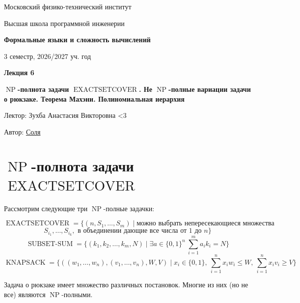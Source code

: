 \documentclass[11pt]{article}
\DeclareMathOperator{\NP}{NP}
\DeclareMathOperator{\EXACTSETC}{EXACTSETCOVER}
\DeclareMathOperator{\SUBSUM}{SUBSET-SUM}
\DeclareMathOperator{\KNAPSACK}{KNAPSACK}
\newcommand{\lectureNumber}{6}
\newcommand{\lectureTitle}{$\NP$-полнота задачи $\EXACTSETC$. Не $\NP$-полные вариации задачи о рюкзаке. Теорема Махэни. Полиномиальная иерархия}
\newcommand{\courseName}{Формальные языки и сложность вычислений}
\newcommand{\semester}{3 семестр, 2026/2027 уч. год}
\begin{document}
\begin{titlepage}
    \centering
    
    {\large Московский физико-технический институт \par}
    {\large Высшая школа программной инженерии \par}
    \vspace{2cm}

    {\Large \textbf{\courseName} \par}
    {\large \semester \par}
    
    \vspace*{\fill}

    {\Huge \textbf{Лекция \lectureNumber} \par}
    {\Huge \textbf{\lectureTitle} \par}
    
    \vspace*{\fill}
    
    {\large Лектор: Зухба Анастасия Викторовна <3\par}
    {\large Автор: \href{https://t.me/sol_m_07}{Соля} \par}

\end{titlepage}


\section{$\NP$-полнота задачи $\EXACTSETC$}

Рассмотрим следующие три $\NP$-полные задачки:

\[\EXACTSETC = \{(n, S_1, \ldots, S_m) \; | \; \text{можно выбрать непересекающиеся множества}\]
\[S_{i_1}, \ldots, S_{i_k}, \text{ в объединении дающие все числа от 1 до } n\}\]
\[\SUBSUM = \{(k_1, k_2, \ldots, k_m, N) \; | \; \exists a \in \{0, 1\}^n \ \sum_{i = 1}^m a_i k_i = N\}\]
\[\KNAPSACK = \{((w_1, \ldots, w_n), (v_1, \ldots, v_n), W, V) \; | \; x_i \in \{0, 1\}, \ \sum_{i = 1}^n x_i w_i \leq W, \ \sum_{i = 1}^n x_i v_i \geq V\}\]

\begin{remark}
  Задача о рюкзаке имеет множество различных постановок. Многие из них (но не все) 
  являются $\NP$-полными.
\end{remark}
\end{document}
